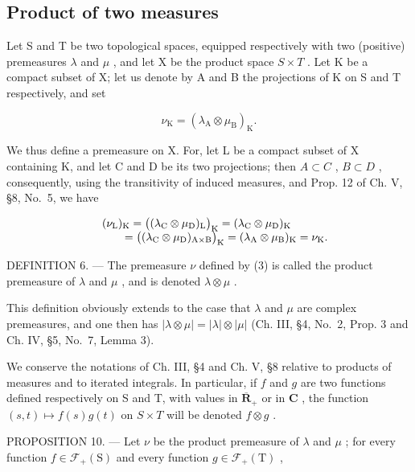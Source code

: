 \subsection{Product of two measures}

Let S and T be two topological spaces, equipped respectively with two (positive) premeasures \(\lambda\) and \(\mu\) , and let X be the product space \(S \times T\) . Let K be a compact subset of X; let us denote by A and B the projections of K on S and T respectively, and set

\[
\nu_ {\mathrm{K}} = \left(\lambda_ {\mathrm{A}} \otimes \mu_ {\mathrm{B}}\right) _ {\mathrm{K}}.\tag{3}
\]

We thus define a premeasure on X. For, let L be a compact subset of X containing K, and let C and D be its two projections; then \(A \subset C\) , \(B \subset D\) , consequently, using the transitivity of induced measures, and Prop. 12 of Ch. V, §8, No.~5, we have

\[
\begin{array}{r l} & {(\nu_ {\mathrm{L}}) _ {\mathrm{K}} = \big ((\lambda_ {\mathrm{C}} \otimes \mu_ {\mathrm{D}}) _ {\mathrm{L}} \big) _ {\mathrm{K}} = (\lambda_ {\mathrm{C}} \otimes \mu_ {\mathrm{D}}) _ {\mathrm{K}}} \\ & {\qquad = \big ((\lambda_ {\mathrm{C}} \otimes \mu_ {\mathrm{D}}) _ {\mathrm{A} \times \mathrm{B}} \big) _ {\mathrm{K}} = (\lambda_ {\mathrm{A}} \otimes \mu_ {\mathrm{B}}) _ {\mathrm{K}} = \nu_ {\mathrm{K}}.} \end{array}
\]

DEFINITION 6. --- The premeasure \(\nu\) defined by (3) is called the product premeasure of \(\lambda\) and \(\mu\) , and is denoted \(\lambda \otimes \mu\) .

This definition obviously extends to the case that \(\lambda\) and \(\mu\) are complex premeasures, and one then has \(|\lambda\otimes\mu|=|\lambda|\otimes|\mu|\) (Ch. III, §4, No.~2, Prop. 3 and Ch. IV, §5, No.~7, Lemma 3).

We conserve the notations of Ch. III, §4 and Ch. V, §8 relative to products of measures and to iterated integrals. In particular, if \(f\) and \(g\) are two functions defined respectively on S and T, with values in \(\overline{\mathbf{R}}_+\) or in \(\mathbf{C}\) , the function \((s,t)\mapsto f(s)g(t)\) on \(S\times T\) will be denoted \(f\otimes g\) .

PROPOSITION 10. --- Let \(\nu\) be the product premeasure of \(\lambda\) and \(\mu\) ; for every function \(f \in \mathcal{F}_{+}(\mathrm{S})\) and every function \(g \in \mathcal{F}_{+}(\mathrm{T})\) ,

